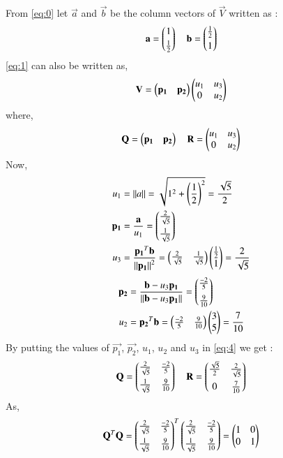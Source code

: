 \documentclass[journal,12pt,twocolumn]{IEEEtran}
\begin{document}
From \eqref{eq:0} let $\vec{a}$ and $\vec{b}$ be the column vectors of $\vec{V}$ written as : 
\begin{align}
    \mathbf{a} = \begin{pmatrix}1 \\[0.1cm] \frac{1}{2}\end{pmatrix}\quad \mathbf{b} = \begin{pmatrix}\frac{1}{2} \\[0.1cm] 1\end{pmatrix}\label{eq:2}
\end{align}
\eqref{eq:1} can also be written as,
\begin{align}
    \mathbf{V}= \begin{pmatrix}\mathbf{p_1} & \mathbf{p_2}\end{pmatrix}\begin{pmatrix}u_1 & u_3 \\ 0 & u_2\end{pmatrix}\label{eq:3}
\end{align}
where,
\begin{align}
    \mathbf{Q}=\begin{pmatrix}\mathbf{p_1} & \mathbf{p_2}\end{pmatrix} \quad \mathbf{R}=\begin{pmatrix}u_1 & u_3\\0 & u_2\end{pmatrix}\label{eq:4}
\end{align}
Now,
\begin{align} 
    u_1 &= \left\lVert a\right\rVert = \sqrt{1^2+\left(\frac{1}{2}\right)^2} = \frac{\sqrt{5}}{2} \\
    \mathbf{p_1} &= \frac{\mathbf{a}}{u_1} = \begin{pmatrix}\frac{2}{\sqrt{5}} \\[0.2cm] \frac{1}{\sqrt{5}}\end{pmatrix} \\
    u_3 &= \frac{\mathbf{p_1}^T\mathbf{b}}{\left\lVert\mathbf{p_1}\right\rVert^2} = \begin{pmatrix}\frac{2}{\sqrt{5}} & \frac{1}{\sqrt{5}}\end{pmatrix}\begin{pmatrix}\frac{1}{2}\\1\end{pmatrix} = \frac{2}{\sqrt{5}}
\end{align}
\begin{align}
    \mathbf{p_2} &= \frac{\mathbf{b} - u_3 \mathbf{p_1}}{\left\lVert\mathbf{b} - u_3 \mathbf{p_1}\right\rVert} = \begin{pmatrix}\frac{-2}{5}\\[0.2cm] \frac{9}{10}\end{pmatrix}\\
    u_2 &= {\mathbf{p_2}^T\mathbf{b}} = \begin{pmatrix}\frac{-2}{5}& \frac{9}{10}\end{pmatrix} \begin{pmatrix}3 \\ 5\end{pmatrix} = \frac{7}{10}\label{eq:8}
\end{align}
By putting the values of $\vec{p_1}$, $\vec{p_2}$, $u_1$, $u_2$ and $u_3$ in \eqref{eq:4} we get : 
\begin{align}
    \mathbf{Q}=\begin{pmatrix}\frac{2}{\sqrt{5}}&\frac{-2}{5}\\[0.2cm]\frac{1}{\sqrt{5}}&\frac{9}{10}\end{pmatrix}\quad \mathbf{R}=\begin{pmatrix}\frac{\sqrt{5}}{2}&\frac{2}{\sqrt{5}}\\[0.2cm]0&\frac{7}{10}\end{pmatrix}
\end{align}
As,
\begin{align}
    \mathbf{Q}^T\mathbf{Q}=\begin{pmatrix}\frac{2}{\sqrt{5}}&\frac{-2}{5}\\[0.2cm]\frac{1}{\sqrt{5}}&\frac{9}{10}\end{pmatrix}^T\begin{pmatrix}\frac{2}{\sqrt{5}}&\frac{-2}{5}\\[0.2cm]\frac{1}{\sqrt{5}}&\frac{9}{10}\end{pmatrix}=\begin{pmatrix}1&0\\0&1\end{pmatrix}
\end{align}
\end{document}
